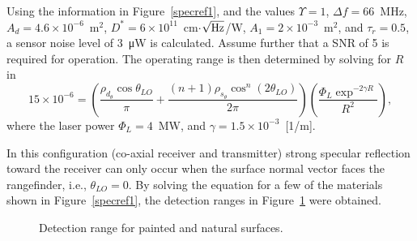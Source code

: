 Using the information in Figure~\ref{specref1},  and the values $\Upsilon = 1$, 
$\Delta f=66$~MHz, $A_d=4.6\times10^{-6}$~m$^2$,
$D^\ast=6\times10^{11}$~cm$\cdot$$\sqrt{\rm Hz}$/W, $A_1=2\times10^{-3}$~m$^2$,
and $\tau_r=0.5$, a sensor noise level of 3~\si{\micro\watt}{} is calculated.
Assume further that a SNR of 5 is required for
operation. The operating range is then determined by solving for $R$ in
\begin{equation}
15\times 10^{-6} = \left(
\frac{\rho_{d_\theta}\cos \theta_{LO}}{\pi}+
\frac{(n+1)\rho_{s_\theta}\cos^n (2\theta_{LO})}{2\pi}
\right)
\left(\frac{
\Phi_L \exp^{-2\gamma R}}{ R^2 }
\right),
\label{lrfi5}
\end{equation}
where the laser power $\Phi_L=4$~MW, and $\gamma=1.5\times10^{-3}$~[1/m].

In this configuration (co-axial receiver and transmitter) strong specular reflection toward the receiver can only occur when the surface normal vector faces the rangefinder, i.e., $\theta_{LO}=0$. By solving the equation for a few of the materials shown in Figure~\ref{specref1}, the detection ranges in Figure~\ref{specref2} were obtained.

\begin{figure}[h]
    \centering
    \caption{\label{specref2}Detection range for painted and natural surfaces.}
    \end{figure}

